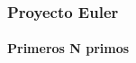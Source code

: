\documentclass{beamer}
\begin{document}
\begin{frame}
    \frametitle{Proyecto Euler}
    \framesubtitle{Primeros N primos}
\end{frame}
\end{document}
